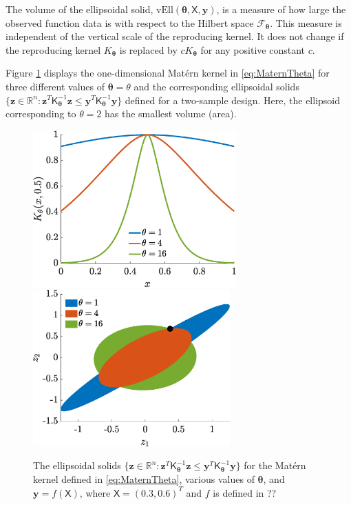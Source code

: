 \documentclass[]{mcom-l}
\theoremstyle{theorem}
\theoremstyle{remark}
\newcommand{\vEll}{\text{vEll}}
\newcommand{\reals}{{\mathbb{R}}}
\newcommand{\mK}{\mathsf{K}}
\newcommand{\mX}{\mathsf{X}}
\newcommand{\by}{{\boldsymbol{y}}}
\newcommand{\bz}{{\boldsymbol{z}}}
\newcommand{\btheta}{{\boldsymbol{\theta}}}
\newcommand{\calf}{{\mathcal{F}}}
\begin{document}
The volume of the ellipsoidal solid, $\vEll(\btheta,\mX,\by)$, is a measure of how large the observed function data is with respect to the Hilbert space $\calf_{\btheta}$.  This measure is independent of the vertical scale of the reproducing kernel.  It does not change if the reproducing kernel $K_\btheta$ is replaced by $cK_{\btheta}$ for any positive constant $c$.  

Figure \ref{fig:ellipPlot} displays the one-dimensional Mat\'ern kernel in \eqref{eq:MaternTheta} for three different values of $\btheta = \theta$ and the corresponding  ellipsoidal solids $\{ \bz \in \reals^n : \bz^T \mK_\btheta^{-1} \bz \le \by^T \mK_\btheta^{-1} \by  \bigr \}$  defined for a two-sample design.  Here, the ellipsoid corresponding to $\theta = 2$ has the smallest volume (area).


\begin{figure}[H]
	\centering
	\includegraphics[height = 6cm]{ProgramsImages/KthetaPlot.eps} \qquad
	\includegraphics[height = 6cm]{ProgramsImages/ellipsesPlot.eps}
	\caption{The ellipsoidal solids $\{ \bz \in \reals^n : \bz^T \mK_\btheta^{-1} \bz \le \by^T \mK_\btheta^{-1} \by  \bigr \}$ for the Mat\'ern kernel defined in \eqref{eq:MaternTheta}, various values of $\btheta$, and $\by = f(\mX)$, where $\mX = (0.3, 0.6)^T$ and $f$ is defined in ?? \label{fig:ellipPlot}}
\end{figure}
\end{document}
